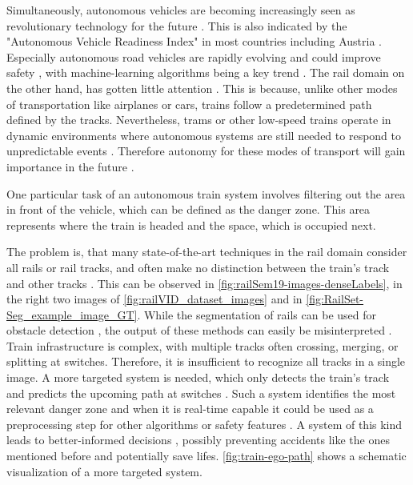 Simultaneously, autonomous vehicles are becoming increasingly seen as revolutionary technology for the future \cite{FraunhoferInstituteforCognitiveSystemsIKS}.
This is also indicated by the "Autonomous Vehicle Readiness Index" \cite{autonomousVehicleReadinessIndex} in most countries including Austria \cite{autonomousVehicleReadinessCounties}.
Especially autonomous road vehicles are rapidly evolving and could improve safety \cite{railsem19dataset} \cite{tepNet2024}, with machine-learning algorithms being a key trend \cite{railsem19dataset}.
The rail domain on the other hand, has gotten little attention \cite{railsem19dataset}.
This is because, unlike other modes of transportation like airplanes or cars, trains follow a predetermined path defined by the tracks.
Nevertheless, trams or other low-speed trains operate in dynamic environments where autonomous systems are still needed to respond to unpredictable events \cite{tepNet2024}.
Therefore autonomy for these modes of transport will gain importance in the future \cite{railNet2019}.

One particular task of an autonomous train system involves filtering out the area in front of the vehicle, which can be defined as the danger zone.
This area represents where the train is headed and the space, which is occupied next.

The problem is, that many state-of-the-art techniques in the rail domain consider all rails or rail tracks, and often make no distinction between the train's track and other tracks \cite{tepNet2024}.
This can be observed in \autoref{fig:railSem19-images-denseLabels}, in the right two images of \autoref{fig:railVID_dataset_images} and in \autoref{fig:RailSet-Seg_example_image_GT}.
While the segmentation of rails can be used for obstacle detection \cite{railNet2019}, the output of these methods can easily be misinterpreted \cite{tepNet2024}.
Train infrastructure is complex, with multiple tracks often crossing, merging, or splitting at switches. Therefore, it is insufficient to recognize all tracks in a single image.
A more targeted system is needed, which only detects the train's track and predicts the upcoming path at switches \cite{tepNet2024}.
Such a system identifies the most relevant danger zone and when it is real-time capable it could be used as a preprocessing step for other algorithms or safety features \cite{tepNet2024} \cite{railNet2019}.
A system of this kind leads to better-informed decisions \cite{tepNet2024}, possibly preventing accidents like the ones mentioned before and potentially save lifes.
\autoref{fig:train-ego-path} shows a schematic visualization of a more targeted system.

